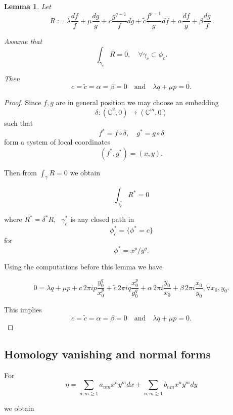 \documentclass[11pt,a4paper]{amsart}
\newtheorem{lemma}[theorem]{Lemma}
\theoremstyle{definition}
\begin{document}
\begin{lemma}

Let
\[
R := \lambda \frac{df}{f} + \mu \frac{dg}{g}
+ c \frac{g^{q-1}}{f} dg + \tilde c \frac{f^{p-1}}{g} df
+ \alpha \frac{df}{g} + \beta \frac{dg}{f}.
\]

Assume that
\[
\int_{\gamma_c} R = 0, \quad \forall \gamma_c \subset \phi_c.
\]

Then
\[
c = \tilde c = \alpha = \beta = 0
\quad \text{and} \quad
\lambda q + \mu p = 0.
\]
\end{lemma}
\begin{proof}

Since \(f,g\) are in general position we may choose an embedding
\[
\delta : (\mathbb C^2,0) \to (\mathbb C^m,0)
\]
such that
\[
f^* = f \circ \delta,
\quad
g^* = g \circ \delta
\]
form a system of local coordinates
\[
(f^*, g^*) = (x,y).
\]

Then from \(\int_\gamma R = 0\) we obtain

\[
\int_{\gamma_c^*} R^* = 0
\]

where $R^*=\delta ^* R$, \, \(\gamma_c^*\) is any closed path in
\[
\phi_c^* = \{ \phi^* = c \}
\]
for
\[
\phi^* = x^p / y^q.
\]

Using the computations before this lemma we have

\[
0 = \lambda q + \mu p
+ c \, 2\pi i p \frac{y_0^q}{x_0^p}
+ \tilde c \, 2\pi i q \frac{x_0^p}{y_0^q}
+ \alpha \, 2\pi i \frac{y_0}{x_0}
+ \beta \, 2\pi i \frac{x_0}{y_0}, \forall x_0,y_0.
\]

This implies
\[
c = \tilde c = \alpha = \beta = 0
\quad \text{and} \quad
\lambda q + \mu p = 0.
\]
\end{proof}



    
    
    
    
    \subsection{Homology vanishing and normal forms}
    
    
    
    
    
For
\[
\eta=\sum_{n,m\ge1} a_{nm}x^n y^m dx + \sum_{n,m\ge1} b_{nm}x^n y^m dy
\]

 we obtain
\end{document}

